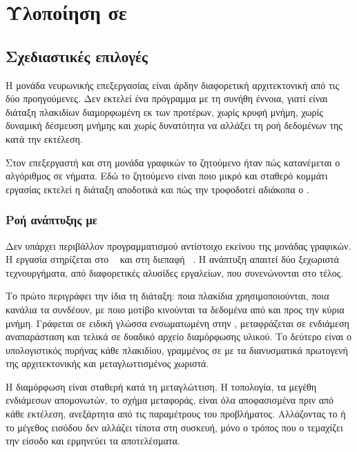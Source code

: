 \chapter{Υλοποίηση σε }
\label{ch:npu}

\section{Σχεδιαστικές επιλογές}
\label{sec:npu-design}

Η μονάδα νευρωνικής επεξεργασίας είναι άρδην διαφορετική αρχιτεκτονική από τις
δύο προηγούμενες. Δεν εκτελεί ένα πρόγραμμα με τη συνήθη έννοια, γιατί είναι
διάταξη πλακιδίων διαμορφωμένη εκ των προτέρων, χωρίς κρυφή μνήμη, χωρίς
δυναμική δέσμευση μνήμης και χωρίς δυνατότητα να αλλάξει τη ροή δεδομένων της
κατά την εκτέλεση.

Στον επεξεργαστή και στη μονάδα γραφικών το ζητούμενο ήταν πώς κατανέμεται ο
αλγόριθμος σε νήματα. Εδώ το ζητούμενο είναι ποιο μικρό και σταθερό κομμάτι
εργασίας εκτελεί η διάταξη αποδοτικά και πώς την τροφοδοτεί αδιάκοπα ο
.

\subsection{Ροή ανάπτυξης με }
\label{sec:npu-toolchain}

Δεν υπάρχει περιβάλλον προγραμματισμού αντίστοιχο εκείνου της μονάδας γραφικών.
Η εργασία στηρίζεται στο ~\cite{mliraie} και στη διεπαφή
~\cite{iron}. Η ανάπτυξη απαιτεί δύο ξεχωριστά τεχνουργήματα, από
διαφορετικές αλυσίδες εργαλείων, που συνενώνονται στο τέλος.

Το πρώτο περιγράφει την ίδια τη διάταξη: ποια πλακίδια χρησιμοποιούνται, ποια
κανάλια τα συνδέουν, με ποιο μοτίβο κινούνται τα δεδομένα από και προς την
κύρια μνήμη. Γράφεται σε ειδική γλώσσα ενσωματωμένη στην ,
μεταφράζεται σε ενδιάμεση αναπαράσταση και τελικά σε δυαδικό αρχείο διαμόρφωσης
υλικού. Το δεύτερο είναι ο υπολογιστικός πυρήνας κάθε πλακιδίου, γραμμένος σε
 με τα διανυσματικά πρωτογενή της αρχιτεκτονικής και μεταγλωττισμένος
χωριστά.

Η διαμόρφωση είναι σταθερή κατά τη μεταγλώττιση. Η τοπολογία, τα μεγέθη
ενδιάμεσων απομονωτών, το σχήμα μεταφοράς, είναι όλα αποφασισμένα πριν από κάθε
εκτέλεση, ανεξάρτητα από τις παραμέτρους του προβλήματος. Αλλάζοντας το 
ή το μέγεθος εισόδου δεν αλλάζει τίποτα στη συσκευή, μόνο ο τρόπος που ο
 τεμαχίζει την είσοδο και ερμηνεύει τα αποτελέσματα.

